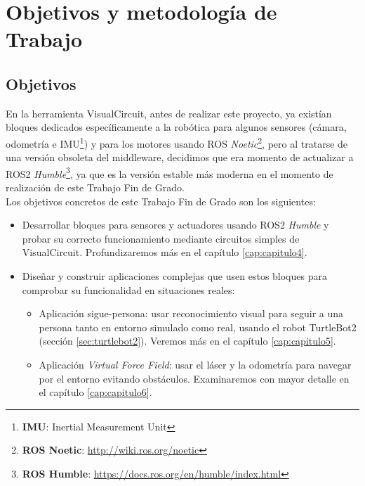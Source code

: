 \chapter{Objetivos y metodología de Trabajo}
\label{cap:capitulo2}

\section{Objetivos}
\label{sec:objetivos}

En la herramienta VisualCircuit, antes de realizar este proyecto, ya existían bloques dedicados específicamente a la robótica para algunos sensores
(cámara, odometría e IMU\footnote{\textbf{IMU}: Inertial Measurement Unit}) y para los motores usando ROS
\textit{Noetic}\footnote{\textbf{ROS Noetic}: \url{http://wiki.ros.org/noetic}}, pero al tratarse de una versión obsoleta del middleware,
decidimos que era momento de actualizar a ROS2 \textit{Humble}\footnote{\textbf{ROS Humble}: \url{https://docs.ros.org/en/humble/index.html}},
ya que es la versión estable más moderna en el momento de realización de este Trabajo Fin de Grado.\\

Los objetivos concretos de este Trabajo Fin de Grado son los siguientes:

\begin{itemize}
	\item   Desarrollar bloques para sensores y actuadores usando ROS2 \textit{Humble} y probar su correcto funcionamiento mediante
                        circuitos simples de VisualCircuit.
                    Profundizaremos más en el capítulo \ref{cap:capitulo4}.
	\item   Diseñar y construir aplicaciones complejas que usen estos bloques para comprobar su funcionalidad en situaciones reales:
    \begin{itemize}
        \item   Aplicación sigue-persona: usar reconocimiento visual para seguir a una persona tanto en entorno simulado como real,
                    usando el robot TurtleBot2 (sección \ref{sec:turtlebot2}).
                    Veremos más en el capítulo \ref{cap:capitulo5}.
        \item   Aplicación \textit{Virtual Force Field}: usar el láser y la odometría para navegar por el entorno evitando obstáculos.
                    Examinaremos con mayor detalle en el capítulo \ref{cap:capitulo6}.
    \end{itemize}
\end{itemize}

